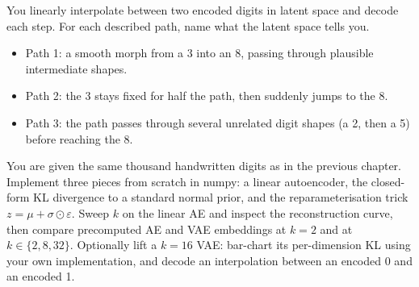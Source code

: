 \vspace{2.5em}


You linearly interpolate between two encoded digits in latent space and decode each step. For each described path, name what the latent space tells you.

\begin{itemize}
    \item Path 1: a smooth morph from a 3 into an 8, passing through plausible intermediate shapes.
    \item Path 2: the 3 stays fixed for half the path, then suddenly jumps to the 8.
    \item Path 3: the path passes through several unrelated digit shapes (a 2, then a 5) before reaching the 8.
\end{itemize}



\vspace{4.5em}



 You are given the same thousand handwritten digits as in the previous chapter. Implement three pieces from scratch in numpy: a linear autoencoder, the closed-form KL divergence to a standard normal prior, and the reparameterisation trick $z = \mu + \sigma \odot \varepsilon$. Sweep $k$ on the linear AE and inspect the reconstruction curve, then compare precomputed AE and VAE embeddings at $k{=}2$ and at $k \in \{2, 8, 32\}$. Optionally lift a $k{=}16$ VAE: bar-chart its per-dimension KL using your own implementation, and decode an interpolation between an encoded 0 and an encoded 1.

